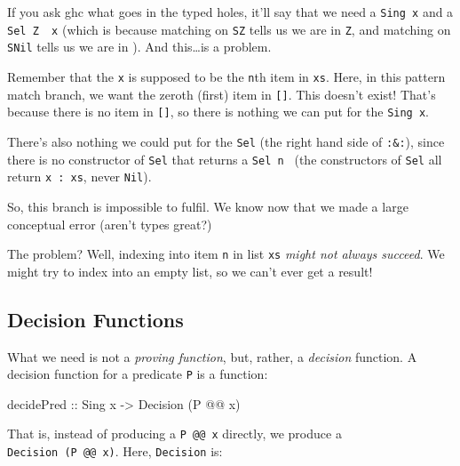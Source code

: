 \documentclass[]{article}
\newenvironment{Shaded}{}{}
\newcommand{\DataTypeTok}[1]{\textcolor[rgb]{0.56,0.13,0.00}{#1}}
\newcommand{\NormalTok}[1]{#1}
\newcommand{\OperatorTok}[1]{\textcolor[rgb]{0.40,0.40,0.40}{#1}}
\newcommand{\OtherTok}[1]{\textcolor[rgb]{0.00,0.44,0.13}{#1}}
\begin{document}
If you ask ghc what goes in the typed holes, it'll say that we need a
\texttt{Sing\ x} and a
\texttt{Sel\ \textquotesingle{}Z\ \textquotesingle{}{[}{]}\ x} (which is because
matching on \texttt{SZ} tells us we are in \texttt{\textquotesingle{}Z}, and
matching on \texttt{SNil} tells us we are in \texttt{\textquotesingle{}{[}{]}}).
And this\ldots is a problem.

Remember that the \texttt{x} is supposed to be the \texttt{n}th item in
\texttt{xs}. Here, in this pattern match branch, we want the zeroth (first) item
in \texttt{{[}{]}}. This doesn't exist! That's because there is no item in
\texttt{{[}{]}}, so there is nothing we can put for the \texttt{Sing\ x}.

There's also nothing we could put for the \texttt{Sel} (the right hand side of
\texttt{:\&:}), since there is no constructor of \texttt{Sel} that returns a
\texttt{Sel\ n\ \textquotesingle{}{[}{]}} (the constructors of \texttt{Sel} all
return \texttt{x\ \textquotesingle{}:\ xs}, never \texttt{Nil}).

So, this branch is impossible to fulfil. We know now that we made a large
conceptual error (aren't types great?)

The problem? Well, indexing into item \texttt{n} in list \texttt{xs} \emph{might
not always succeed}. We might try to index into an empty list, so we can't ever
get a result!

\hypertarget{decision-functions}{%
\subsection{Decision Functions}\label{decision-functions}}

What we need is not a \emph{proving function}, but, rather, a \emph{decision}
function. A decision function for a predicate \texttt{P} is a function:

\begin{Shaded}
\begin{Highlighting}[]
\OtherTok{decidePred ::} \DataTypeTok{Sing}\NormalTok{ x}
           \OtherTok{{-}>} \DataTypeTok{Decision}\NormalTok{ (}\DataTypeTok{P} \OperatorTok{@@}\NormalTok{ x)}
\end{Highlighting}
\end{Shaded}

That is, instead of producing a \texttt{P\ @@\ x} directly, we produce a
\texttt{Decision\ (P\ @@\ x)}. Here, \texttt{Decision} is:
\end{document}
